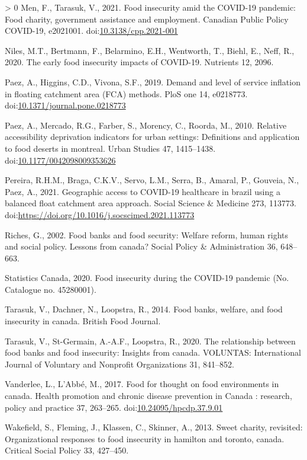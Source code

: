\documentclass[]{elsarticle} %
\newlength{\cslhangindent}
\newenvironment{CSLReferences}[3] %
 {%
  \setlength{\parindent}{0pt}
  \ifodd #1 \everypar{\setlength{\hangindent}{\cslhangindent}}\ignorespaces\fi
  \ifnum #2 > 0
  \setlength{\parskip}{#2\baselineskip}
  \fi
 }%
 {}
\begin{document}
\begin{CSLReferences}{1}{0}
\leavevmode\hypertarget{ref-men2021food}{}%
Men, F., Tarasuk, V., 2021. Food insecurity amid the COVID-19 pandemic:
Food charity, government assistance and employment. Canadian Public
Policy COVID-19, e2021001.
doi:\href{https://doi.org/10.3138/cpp.2021-001}{10.3138/cpp.2021-001}

\leavevmode\hypertarget{ref-niles2020early}{}%
Niles, M.T., Bertmann, F., Belarmino, E.H., Wentworth, T., Biehl, E.,
Neff, R., 2020. The early food insecurity impacts of COVID-19. Nutrients
12, 2096.

\leavevmode\hypertarget{ref-paez2019demand}{}%
Paez, A., Higgins, C.D., Vivona, S.F., 2019. Demand and level of service
inflation in floating catchment area (FCA) methods. PloS one 14,
e0218773.
doi:\href{https://doi.org/10.1371/journal.pone.0218773}{10.1371/journal.pone.0218773}

\leavevmode\hypertarget{ref-paez2010relative}{}%
Paez, A., Mercado, R.G., Farber, S., Morency, C., Roorda, M., 2010.
Relative accessibility deprivation indicators for urban settings:
Definitions and application to food deserts in montreal. Urban Studies
47, 1415--1438.
doi:\href{https://doi.org/10.1177/0042098009353626}{10.1177/0042098009353626}

\leavevmode\hypertarget{ref-pereira2021geographic}{}%
Pereira, R.H.M., Braga, C.K.V., Servo, L.M., Serra, B., Amaral, P.,
Gouveia, N., Paez, A., 2021. Geographic access to COVID-19 healthcare in
brazil using a balanced float catchment area approach. Social Science \&
Medicine 273, 113773.
doi:\url{https://doi.org/10.1016/j.socscimed.2021.113773}

\leavevmode\hypertarget{ref-riches2002food}{}%
Riches, G., 2002. Food banks and food security: Welfare reform, human
rights and social policy. Lessons from canada? Social Policy \&
Administration 36, 648--663.

\leavevmode\hypertarget{ref-statisticscanada2020food}{}%
Statistics Canada, 2020. Food insecurity during the COVID-19 pandemic
(No. Catalogue no. 45280001).

\leavevmode\hypertarget{ref-tarasuk2014food}{}%
Tarasuk, V., Dachner, N., Loopstra, R., 2014. Food banks, welfare, and
food insecurity in canada. British Food Journal.

\leavevmode\hypertarget{ref-tarasuk2020relationship}{}%
Tarasuk, V., St-Germain, A.-A.F., Loopstra, R., 2020. The relationship
between food banks and food insecurity: Insights from canada. VOLUNTAS:
International Journal of Voluntary and Nonprofit Organizations 31,
841--852.

\leavevmode\hypertarget{ref-vanderlee2017food}{}%
Vanderlee, L., L'Abbé, M., 2017. Food for thought on food environments
in canada. Health promotion and chronic disease prevention in Canada :
research, policy and practice 37, 263--265.
doi:\href{https://doi.org/10.24095/hpcdp.37.9.01}{10.24095/hpcdp.37.9.01}

\leavevmode\hypertarget{ref-wakefield2013sweet}{}%
Wakefield, S., Fleming, J., Klassen, C., Skinner, A., 2013. Sweet
charity, revisited: Organizational responses to food insecurity in
hamilton and toronto, canada. Critical Social Policy 33, 427--450.

\end{CSLReferences}
\end{document}

